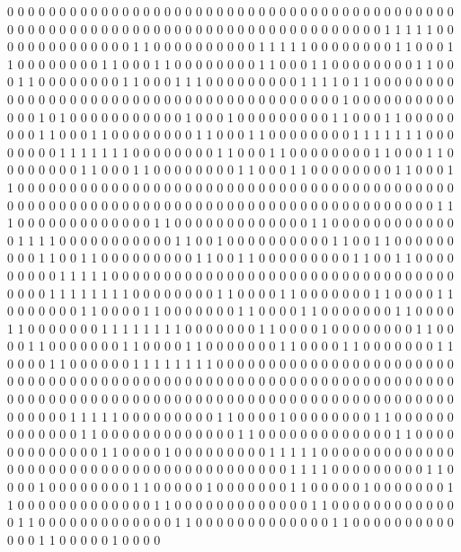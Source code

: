 0 0 0 0 0 0 0 0 0 0 0 0 0 0 0
0 0 0 0 0 0 0 0 0 0 0 0 0 0 0
0 0 0 0 0 0 0 0 0 0 0 0 0 0 0
0 0 0 0 0 0 0 0 0 0 0 0 0 0 0
0 0 0 0 0 0 0 0 0 0 0 0 0 0 0
0 0 0 0 1 1 1 1 1 0 0 0 0 0 0
0 0 0 0 0 0 0 0 1 1 0 0 0 0 0
0 0 0 0 0 1 1 1 1 1 0 0 0 0 0
0 0 0 1 1 0 0 0 1 1 0 0 0 0 0
0 0 0 1 1 0 0 0 1 1 0 0 0 0 0
0 0 0 1 1 0 0 0 1 1 0 0 0 0 0
0 0 0 1 1 0 0 0 1 1 0 0 0 0 0
0 0 0 1 1 0 0 0 1 1 1 0 0 0 0
0 0 0 0 0 1 1 1 1 0 1 1 0 0 0
0 0 0 0 0 0 0 0 0 0 0 0 0 0 0
0 0 0 0 0 0 0 0 0 0 0 0 0 0 0
0 0 0 0 0 0 0 1 0 0 0 0 0 0 0
0 0 0 0 0 0 1 0 1 0 0 0 0 0 0
0 0 0 0 0 1 0 0 0 1 0 0 0 0 0
0 0 0 0 1 1 0 0 0 1 1 0 0 0 0
0 0 0 0 1 1 0 0 0 1 1 0 0 0 0
0 0 0 0 1 1 0 0 0 1 1 0 0 0 0
0 0 0 0 1 1 1 1 1 1 1 0 0 0 0
0 0 0 0 1 1 1 1 1 1 1 0 0 0 0
0 0 0 0 1 1 0 0 0 1 1 0 0 0 0
0 0 0 0 1 1 0 0 0 1 1 0 0 0 0
0 0 0 0 1 1 0 0 0 1 1 0 0 0 0
0 0 0 0 1 1 0 0 0 1 1 0 0 0 0
0 0 0 0 1 1 0 0 0 1 1 0 0 0 0
0 0 0 0 0 0 0 0 0 0 0 0 0 0 0
0 0 0 0 0 0 0 0 0 0 0 0 0 0 0
0 0 0 0 0 0 0 0 0 0 0 0 0 0 0
0 0 0 0 0 0 0 0 0 0 0 0 0 0 0
0 0 0 0 0 0 0 0 0 0 0 0 0 0 0
0 0 0 0 1 1 1 0 0 0 0 0 0 0 0
0 0 0 0 0 1 1 0 0 0 0 0 0 0 0
0 0 0 0 0 1 1 0 0 0 0 0 0 0 0
0 0 0 0 0 1 1 1 1 0 0 0 0 0 0
0 0 0 0 0 1 1 0 0 1 0 0 0 0 0
0 0 0 0 0 1 1 0 0 1 1 0 0 0 0
0 0 0 0 0 1 1 0 0 1 1 0 0 0 0
0 0 0 0 0 1 1 0 0 1 1 0 0 0 0
0 0 0 0 0 1 1 0 0 1 1 0 0 0 0
0 0 0 0 0 1 1 1 1 1 0 0 0 0 0
0 0 0 0 0 0 0 0 0 0 0 0 0 0 0
0 0 0 0 0 0 0 0 0 0 0 0 0 0 0
0 0 1 1 1 1 1 1 1 1 0 0 0 0 0
0 0 0 1 1 0 0 0 0 1 1 0 0 0 0
0 0 0 1 1 0 0 0 0 1 1 0 0 0 0
0 0 0 1 1 0 0 0 0 1 1 0 0 0 0
0 0 0 1 1 0 0 0 0 1 1 0 0 0 0
0 0 0 1 1 0 0 0 0 1 1 0 0 0 0
0 0 0 1 1 1 1 1 1 1 1 0 0 0 0
0 0 0 1 1 0 0 0 0 1 0 0 0 0 0
0 0 0 1 1 0 0 0 0 1 1 0 0 0 0
0 0 0 1 1 0 0 0 0 1 1 0 0 0 0
0 0 0 1 1 0 0 0 0 1 1 0 0 0 0
0 0 0 1 1 0 0 0 0 1 1 0 0 0 0
0 0 1 1 1 1 1 1 1 1 0 0 0 0 0
0 0 0 0 0 0 0 0 0 0 0 0 0 0 0
0 0 0 0 0 0 0 0 0 0 0 0 0 0 0
0 0 0 0 0 0 0 0 0 0 0 0 0 0 0
0 0 0 0 0 0 0 0 0 0 0 0 0 0 0
0 0 0 0 0 0 0 0 0 0 0 0 0 0 0
0 0 0 0 0 0 0 0 0 0 0 0 0 0 0
0 0 0 0 0 0 0 0 0 0 0 0 0 0 0
0 0 0 0 0 1 1 1 1 1 0 0 0 0 0
0 0 0 0 1 1 0 0 0 0 1 0 0 0 0
0 0 0 0 1 1 0 0 0 0 0 0 0 0 0
0 0 0 0 1 1 0 0 0 0 0 0 0 0 0
0 0 0 0 1 1 0 0 0 0 0 0 0 0 0
0 0 0 0 1 1 0 0 0 0 0 0 0 0 0
0 0 0 0 1 1 0 0 0 0 1 0 0 0 0
0 0 0 0 0 1 1 1 1 1 0 0 0 0 0
0 0 0 0 0 0 0 0 0 0 0 0 0 0 0
0 0 0 0 0 0 0 0 0 0 0 0 0 0 0
0 0 0 0 0 1 1 1 1 0 0 0 0 0 0
0 0 0 1 1 0 0 0 0 1 0 0 0 0 0
0 0 0 1 1 0 0 0 0 0 1 0 0 0 0
0 0 0 1 1 0 0 0 0 0 1 0 0 0 0
0 0 0 1 1 0 0 0 0 0 0 0 0 0 0
0 0 0 1 1 0 0 0 0 0 0 0 0 0 0
0 0 0 1 1 0 0 0 0 0 0 0 0 0 0
0 0 0 1 1 0 0 0 0 0 0 0 0 0 0
0 0 0 1 1 0 0 0 0 0 0 0 0 0 0
0 0 0 1 1 0 0 0 0 0 0 0 0 0 0
0 0 0 1 1 0 0 0 0 0 1 0 0 0 0
